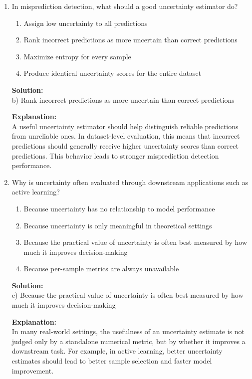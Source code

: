 \documentclass{article}
\begin{document}
\begin{enumerate}
\textbf{Explanation:} \\
The Brier score measures the mean squared difference between predicted probabilities and the true labels. Lower values indicate better calibrated and more accurate probabilistic predictions, while higher values indicate larger mismatch between confidence and correctness.

\vspace{2mm}

\item In misprediction detection, what should a good uncertainty estimator do?

\begin{enumerate}
    \item Assign low uncertainty to all predictions
    \item Rank incorrect predictions as more uncertain than correct predictions
    \item Maximize entropy for every sample
    \item Produce identical uncertainty scores for the entire dataset
\end{enumerate}

\textbf{Solution:} \\
b) Rank incorrect predictions as more uncertain than correct predictions

\textbf{Explanation:} \\
A useful uncertainty estimator should help distinguish reliable predictions from unreliable ones. In dataset-level evaluation, this means that incorrect predictions should generally receive higher uncertainty scores than correct predictions. This behavior leads to stronger misprediction detection performance.

\vspace{2mm}

\item Why is uncertainty often evaluated through downstream applications such as active learning?

\begin{enumerate}
    \item Because uncertainty has no relationship to model performance
    \item Because uncertainty is only meaningful in theoretical settings
    \item Because the practical value of uncertainty is often best measured by how much it improves decision-making
    \item Because per-sample metrics are always unavailable
\end{enumerate}

\textbf{Solution:} \\
c) Because the practical value of uncertainty is often best measured by how much it improves decision-making

\textbf{Explanation:} \\
In many real-world settings, the usefulness of an uncertainty estimate is not judged only by a standalone numerical metric, but by whether it improves a downstream task. For example, in active learning, better uncertainty estimates should lead to better sample selection and faster model improvement.

\end{enumerate}
\end{document}
